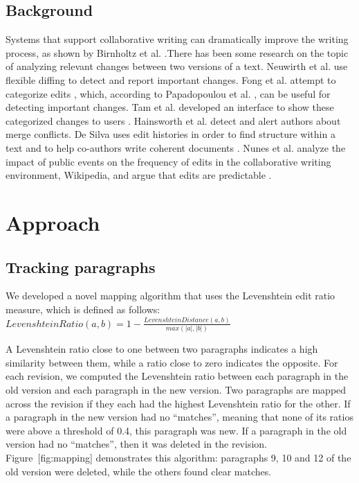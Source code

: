 \subsection{Background}\label{background}

Systems that support collaborative writing can dramatically improve the
writing process, as shown by Birnholtz et al.
\cite{birnholtz2012tracking}.There has been some research on the topic
of analyzing relevant changes between two versions of a text. Neuwirth
et al. use flexible diffing \cite{neuwirth1992flexible} to detect and
report important changes. Fong et al. attempt to categorize edits
\cite{fong2010did}, which, according to Papadopoulou et al.
\cite{papadopoulou2007structured}, can be useful for detecting important
changes. Tam et al. developed an interface to show these categorized
changes to users \cite{tam2006framework}. Hainsworth et al.
\cite{hainsworth2006enabling} detect and alert authors about merge
conflicts. De Silva uses edit histories in order to find structure
within a text and to help co-authors write coherent documents
\cite{de2007narrative}. Nunes et al. analyze the impact of public events
on the frequency of edits in the collaborative writing environment,
Wikipedia, and argue that edits are predictable
\cite{nunes2008wikichanges}.

\section{Approach}\label{approach}

\subsection{Tracking paragraphs}\label{tracking-paragraphs}

We developed a novel mapping algorithm that uses the Levenshtein edit
ratio measure, which is defined as follows:
\(Levenshtein Ratio(a,b) = 1-\frac{Levenshtein Distance(a,b)}{max(|a|,|b|)} \)

A Levenshtein ratio close to one between two paragraphs indicates a high
similarity between them, while a ratio close to zero indicates the
opposite. For each revision, we computed the Levenshtein ratio between
each paragraph in the old version and each paragraph in the new version.
Two paragraphs are mapped across the revision if they each had the
highest Levenshtein ratio for the other. If a paragraph in the new
version had no ``matches'', meaning that none of its ratios were above a
threshold of 0.4, this paragraph was new. If a paragraph in the old
version had no ``matches'', then it was deleted in the revision.
Figure~{[}fig:mapping{]} demonstrates this algorithm: paragraphs 9, 10
and 12 of the old version were deleted, while the others found clear
matches.

